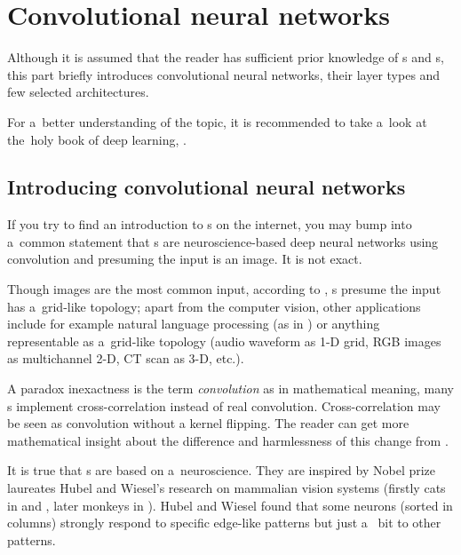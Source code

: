 \chapter{Convolutional neural networks}
\label{cnn}


Although it is assumed that the reader has sufficient prior knowledge of
s and s, this part briefly 
introduces convolutional neural networks, their layer types and few selected 
architectures. 

For a~better understanding of the topic, it is recommended to take a~look at
the~holy book of deep learning, \cite{dl}.

\section{Introducing convolutional neural networks}
\label{understanding-cnn}

If you try to find an introduction to s on the internet, you may bump 
into a~common statement that s are neuroscience-based deep neural
networks using convolution and presuming the input is an image. It is not 
exact. 

Though images are the most common input, according to \cite{dl}, s 
presume the input has a~grid-like topology; apart from the computer vision, 
other applications include  for example natural language processing (as in 
\cite{cnn-nlp}) or anything representable as a~grid-like topology (audio 
waveform as 1-D grid, RGB images as multichannel 2-D, CT scan as 3-D, etc.). 

A paradox inexactness is the term \textit{convolution} as in mathematical 
meaning, many s implement cross-correlation instead of real convolution. 
Cross-correlation may be seen as convolution without a kernel flipping. The 
reader can get more mathematical insight about the difference and harmlessness 
of this change from \cite{dl}. 

It is true that s are based on a~neuroscience. They are inspired by 
Nobel prize laureates Hubel and Wiesel's research on mammalian vision systems 
(firstly cats in \cite{hubel-cats1} and \cite{hubel-cats2}, later monkeys in 
\cite{hubel-monkeys}). Hubel and Wiesel found that some neurons (sorted in 
columns) strongly respond to specific edge-like patterns but just a~
bit to other patterns. 

